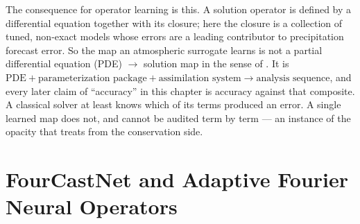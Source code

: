 The consequence for operator learning is this. A solution operator is
defined by a differential equation together with its closure; here the closure is a
collection of tuned, non-exact models whose errors are a leading contributor to precipitation
forecast error. So the map an atmospheric surrogate learns is not a partial
differential equation (PDE) $\to$ solution map in the sense of
. It is
$\text{PDE} + \text{parameterization package} + \text{assimilation system} \to \text{analysis sequence}$,
and every later claim of ``accuracy'' in this chapter is accuracy against that composite.
A classical solver at least knows which of its terms produced an error. A single learned
map does not, and cannot be audited term by term --- an instance of the opacity that
 treats from the
conservation side.

\section{FourCastNet and Adaptive Fourier Neural Operators}
\label{sec:ch33-fourcastnet}


